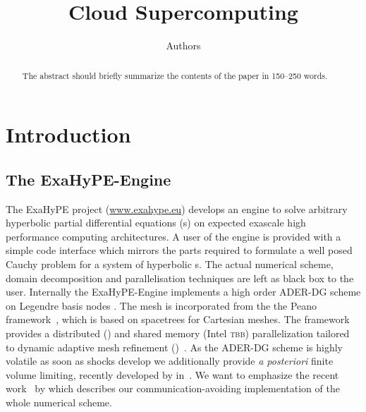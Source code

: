 \documentclass[runningheads]{llncs}
\title{Cloud Supercomputing}
\author{Authors}
\institute{Institute}
\begin{document}
\maketitle
\begin{abstract}
The abstract should briefly summarize the contents of the paper in
150--250 words.

\end{abstract}
\section{Introduction}
\subsection{The ExaHyPE-Engine}
The ExaHyPE project (\url{www.exahype.eu}) develops an engine to solve arbitrary hyperbolic partial differential equations (\pde{}s) on expected exascale high performance computing architectures.
A user of the engine is provided with a simple code interface which mirrors the parts required to formulate a well posed Cauchy problem for a system of hyperbolic \pde{}s.
The actual numerical scheme, domain decomposition and parallelisation techniques are left as black box to the user.
Internally the ExaHyPE-Engine implements a high order ADER-DG scheme on Legendre basis nodes .
The mesh is incorporated from the the Peano framework~\cite{weinzierl2011}, which is based on spacetrees for Cartesian meshes.
The framework provides a distributed (\mpi{}) and shared memory (Intel \textsc{tbb}) parallelization tailored to dynamic adaptive mesh refinement (\amr{})~.
As the ADER-DG scheme is highly volatile as soon as shocks develop we additionally provide \textit{a posteriori} finite volume limiting, recently developed by \citeauthor{dumbser2016simple} in~\cite{dumbser2016simple}.
We want to emphasize the recent work~\cite{charrier2018stop} by \citeauthor{charrier2018stop} which describes our communication-avoiding implementation of the whole numerical scheme.
\newcommand{\diffCoeff}{\varepsilon}
\newcommand{\hyperFluxDef}{
  \begin{pmatrix}
    \Qj \\
    \Qv  \otimes \Qj + \bm{I} \pressure  \\
    \Qv \cdot (\bm{I} \QE + \bm{I} \pressure) \\
    \Qj \QZZ
  \end{pmatrix}
}
\newcommand{\viscFluxDef}{
  \begin{pmatrix}
    0\\
     \stressT (\Q, \gradQ)  \\
     \Qv \cdot \stressT (\Q, \gradQ) - \kappa \gradient{T}\\
     0\\
   \end{pmatrix}
}%
\end{document}
